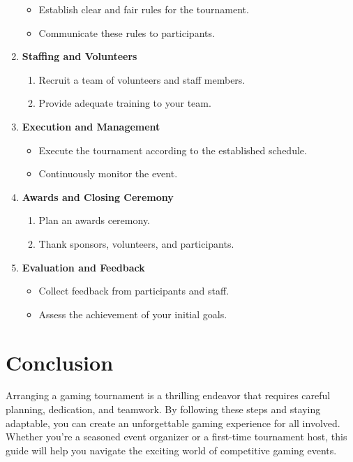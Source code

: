 \documentclass[11pt,a4paper]{article}
\begin{document}
\begin{multicols}{2}
\begin{enumerate}
\begin{itemize}
			\item Establish clear and fair rules for the tournament.
			\item Communicate these rules to participants.
		\end{itemize}
		\item \textbf{Staffing and Volunteers}
		\begin{enumerate}
			\item Recruit a team of volunteers and staff members.
			\item Provide adequate training to your team.
		\end{enumerate}
		\item \textbf{Execution and Management}
		\begin{itemize}
			\item Execute the tournament according to the established schedule.
			\item Continuously monitor the event.
		\end{itemize}
		\item \textbf{Awards and Closing Ceremony}
		\begin{enumerate}
			\item Plan an awards ceremony.
			\item Thank sponsors, volunteers, and participants.
		\end{enumerate}
		\item \textbf{Evaluation and Feedback}
		\begin{itemize}
			\item Collect feedback from participants and staff.
			\item Assess the achievement of your initial goals.
		\end{itemize}
	\end{enumerate}
	\end{multicols}
	
	\section{Conclusion}
	Arranging a gaming tournament is a thrilling endeavor that requires careful planning, dedication, and teamwork. By following these steps and staying adaptable, you can create an unforgettable gaming experience for all involved. Whether you’re a seasoned event organizer or a first-time tournament host, this guide will help you navigate the exciting world of competitive gaming events.
	
\end{document}
